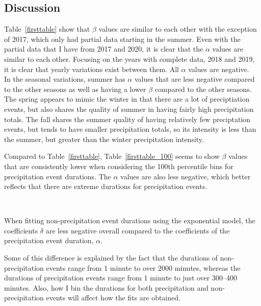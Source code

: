 \documentclass[11pt]{report}
\begin{document}
\clearpage

\subsection{Discussion}\label{sec:apcd}

Table~\ref{firsttable} show that $\beta$ values are similar to each other
with the exception of 2017, which only had partial data starting in the
summer. Even with the partial data that I have from 2017 and 2020, it is
clear that the $\alpha$ values are similar to each other. Focusing on the
years with complete data, 2018 and 2019, it is clear that yearly variations
exist between them. All $\alpha$ values are negative.\\[-1.5em]





In the seasonal variations, summer has $\alpha$ values that are
less negative compared to the other seasons as well as having a lower
$\beta$ compared to the other seasons.  The spring appears to mimic the
winter in that there are a lot of preciptiation events, but also shares the
quality of summer in having fairly high precipitation totals. The fall
shares the summer quality of having relatively few preciptation events, but
tends to have smaller precipitation totals, so its intensity is less than
the summer, but greater than the winter precipitation intensity.

Compared to Table~\ref{firsttable}, Table~\ref{firsttable_100} seems to show
$\beta$ values that are consistently lower when considering the 100th
percentile bins for precipitation event durations. The $\alpha$ values are
also less negative, which better reflects that there are extreme durations
for precipitation events.

\ 





When fitting non-precipitation event durations using the exponential model,
the coefficients $\delta$ are less negative overall compared to the
coefficients of the precipitation event duration, $\alpha$.

Some of this difference is explained by the fact that the durations of
non-precipitation events range from 1 minute to over 2000 minutes, whereas
the durations of precipitation events range from 1 minute to just over
300--400 minutes. Also, how I bin the durations for both precipitation and
non-precipitation events will affect how the fits are obtained.
\end{document}
